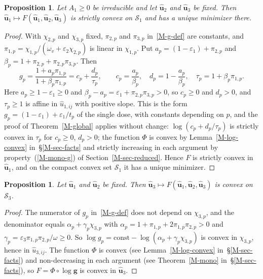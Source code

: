 \documentclass[11pt]{article}
\theoremstyle{plain}
\newtheorem{proposition}[theorem]{Proposition}
\theoremstyle{remark}
\numberwithin{equation}{section}
\begin{document}
\begin{proposition}\label{t-block1}
Let $A_1\ge 0$ be irreducible and let $\widehat{\bm u}_2$ and
$\widehat{\bm u}_3$ be fixed. Then
$\widehat{\bm u}_1\mapsto F(\widehat{\bm u}_1,\widehat{\bm u}_2,\widehat{\bm u}_3)$
is strictly convex on $\mathcal{S}_1$ and has a unique minimizer there.
\end{proposition}
\begin{proof}
With $\chi_{2,p}$ and $\chi_{3,p}$ fixed, $\pi_{2,p}$ and $\pi_{3,p}$ in~\eqref{M-g-def}
are constants, and $\pi_{1,p}=\chi_{1,p}/(\omega_v+\varepsilon_2\chi_{2,p})$ is linear
in $\chi_{1,p}$. Put $a_p=(1-\varepsilon_1)+\pi_{2,p}$ and
$\beta_p=1+\pi_{2,p}+\pi_{2,p}\pi_{3,p}$. Then
\begin{equation}
g_p=\frac{1+a_p\pi_{1,p}}{1+\beta_p\pi_{1,p}}=c_p+\frac{d_p}{\tau_p},\qquad
c_p=\frac{a_p}{\beta_p},\quad d_p=1-\frac{a_p}{\beta_p},\quad
\tau_p=1+\beta_p\pi_{1,p}.
\end{equation}
Here $a_p\ge 1-\varepsilon_1\ge 0$ and $\beta_p-a_p=\varepsilon_1+\pi_{2,p}\pi_{3,p}>0$,
so $c_p\ge 0$ and $d_p>0$, and $\tau_p\ge 1$ is affine in $\widehat u_{1,ij}$
with positive slope. This is the form $g_p=(1-\varepsilon_1)+\varepsilon_1/t_p$
of the single dose, with constants depending on $p$, and the proof of
Theorem~\ref{M-global} applies without change: $\log(c_p+d_p/\tau_p)$ is
strictly convex in $\tau_p$ for $c_p\ge 0$, $d_p>0$; the function $\Phi$ is convex
by Lemma~\ref{M-log-convex} in~\S\ref{M-sec-facts} and strictly increasing in each argument by
property~(\ref{M-mono-g}) of Section~\ref{M-sec-reduced}. Hence $F$ is strictly convex in $\widehat{\bm u}_1$, and
on the compact convex set $\mathcal{S}_1$ it has a unique minimizer.
\end{proof}

\begin{proposition}\label{t-block3}
Let $\widehat{\bm u}_1$ and $\widehat{\bm u}_2$ be fixed. Then
$\widehat{\bm u}_3\mapsto F(\widehat{\bm u}_1,\widehat{\bm u}_2,\widehat{\bm u}_3)$
is convex on $\mathcal{S}_3$.
\end{proposition}
\begin{proof}
The numerator of $g_p$ in~\eqref{M-g-def} does not depend on $\chi_{3,p}$, and the
denominator equals $\alpha_p+\gamma_p\chi_{3,p}$ with
$\alpha_p=1+\pi_{1,p}+2\pi_{1,p}\pi_{2,p}>0$ and
$\gamma_p=\varepsilon_3\pi_{1,p}\pi_{2,p}/\omega\ge 0$. So
$\log g_p=\mathrm{const}-\log\left(\alpha_p+\gamma_p\chi_{3,p}\right)$ is convex in
$\chi_{3,p}$, hence in $\widehat u_{3,ij}$. The function $\Phi$ is convex
(see Lemma~\ref{M-log-convex} in~\S\ref{M-sec-facts}) and non-decreasing in
each argument (see Theorem~\ref{M-mono} in~\S\ref{M-sec-facts}), so $F=\Phi\circ\log\bm g$ is convex in
$\widehat{\bm u}_3$.
\end{proof}
\end{document}

